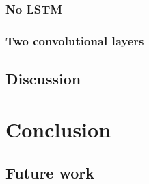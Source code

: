         \subsubsection{No LSTM}
        
        \subsubsection{Two convolutional layers}
        
    \subsection{Discussion}
    

\section{\label{chap:conclusion}Conclusion}

    \subsection{Future work}
    
